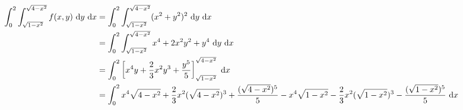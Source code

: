 \documentclass[main.tex]{subfiles}
\begin{document}
\begin{align*}
    \int_{0}^{2} \int_{\sqrt{1-x^2}}^{\sqrt{4-x^2}} f(x,y) ~\mathrm{d}y ~\mathrm{d}x 
    &=
    \int_{0}^{2} \int_{\sqrt{1-x^2}}^{\sqrt{4-x^2}} (x^{2} + y^{2})^{2} ~\mathrm{d}y ~\mathrm{d}x \\
    &=
    \int_{0}^{2} \int_{\sqrt{1-x^2}}^{\sqrt{4-x^2}} x^4 + 2x^2y^2 + y^4 ~\mathrm{d}y ~\mathrm{d}x \\
    &=
    \int_{0}^{2} \left[
        x^4 y +\frac{2}{3} x^2 y^3 + \frac{y^5}{5}
    \right]_{\sqrt{1-x^2}}^{\sqrt{4-x^2}} ~\mathrm{d}x \\
    &=
    \int_{0}^{2}
        x^4 \sqrt{4-x^2} +\frac{2}{3} x^2 (\sqrt{4-x^2})^3 + \frac{(\sqrt{4-x^2})^5}{5}
        - x^4 \sqrt{1-x^2} - \frac{2}{3} x^2 (\sqrt{1-x^2})^3 - \frac{(\sqrt{1-x^2})^5}{5}
    ~\mathrm{d}x \\
\end{align*}
\end{document}
